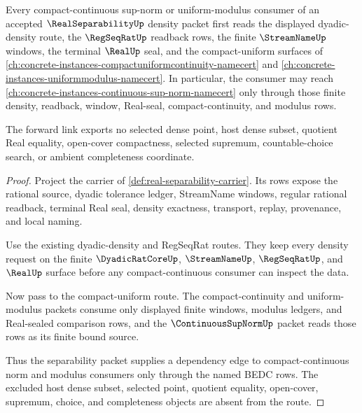 \begin{theorem}
\label{thm:real-separability-continuous-sup-norm-forward-link}
Every compact-continuous sup-norm or uniform-modulus consumer of an accepted $\RealSeparabilityUp$ density packet first reads the displayed dyadic-density route, the $\RegSeqRatUp$ readback rows, the finite $\StreamNameUp$ windows, the terminal $\RealUp$ seal, and the compact-uniform surfaces of \autoref{ch:concrete-instances-compactuniformcontinuity-namecert} and \autoref{ch:concrete-instances-uniformmodulus-namecert}. In particular, the consumer may reach \autoref{ch:concrete-instances-continuous-sup-norm-namecert} only through those finite density, readback, window, Real-seal, compact-continuity, and modulus rows.

The forward link exports no selected dense point, host dense subset, quotient Real equality, open-cover compactness, selected supremum, countable-choice search, or ambient completeness coordinate.
\end{theorem}
\begin{proof}
Project the carrier of \autoref{def:real-separability-carrier}. Its rows expose the rational source, dyadic tolerance ledger, StreamName windows, regular rational readback, terminal Real seal, density exactness, transport, replay, provenance, and local naming.

Use the existing dyadic-density and RegSeqRat routes. They keep every density request on the finite $\DyadicRatCoreUp$, $\StreamNameUp$, $\RegSeqRatUp$, and $\RealUp$ surface before any compact-continuous consumer can inspect the data.

Now pass to the compact-uniform route. The compact-continuity and uniform-modulus packets consume only displayed finite windows, modulus ledgers, and Real-sealed comparison rows, and the $\ContinuousSupNormUp$ packet reads those rows as its finite bound source.

Thus the separability packet supplies a dependency edge to compact-continuous norm and modulus consumers only through the named BEDC rows. The excluded host dense subset, selected point, quotient equality, open-cover, supremum, choice, and completeness objects are absent from the route.
\end{proof}
